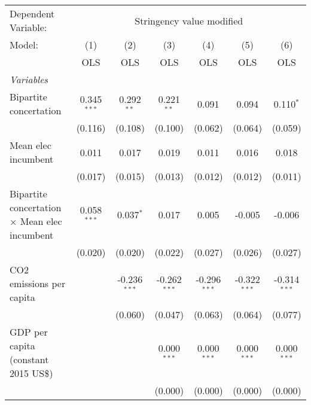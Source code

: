 
\begingroup
\centering
\begin{tabular}{lcccccc}
   \toprule
   Dependent Variable: & \multicolumn{6}{c}{Stringency value modified}\\
   Model:                                               & (1)           & (2)            & (3)            & (4)            & (5)            & (6)\\  
                                                        &  OLS          & OLS            & OLS            & OLS            & OLS            & OLS\\  
   \midrule
   \emph{Variables}\\
   Bipartite concertation                               & 0.345$^{***}$ & 0.292$^{**}$   & 0.221$^{**}$   & 0.091          & 0.094          & 0.110$^{*}$\\   
                                                        & (0.116)       & (0.108)        & (0.100)        & (0.062)        & (0.064)        & (0.059)\\   
   Mean elec incumbent                                  & 0.011         & 0.017          & 0.019          & 0.011          & 0.016          & 0.018\\   
                                                        & (0.017)       & (0.015)        & (0.013)        & (0.012)        & (0.012)        & (0.011)\\   
   Bipartite concertation $\times$ Mean elec incumbent  & 0.058$^{***}$ & 0.037$^{*}$    & 0.017          & 0.005          & -0.005         & -0.006\\   
                                                        & (0.020)       & (0.020)        & (0.022)        & (0.027)        & (0.026)        & (0.027)\\   
   CO2 emissions per capita                             &               & -0.236$^{***}$ & -0.262$^{***}$ & -0.296$^{***}$ & -0.322$^{***}$ & -0.314$^{***}$\\   
                                                        &               & (0.060)        & (0.047)        & (0.063)        & (0.064)        & (0.077)\\   
   GDP per capita (constant 2015 US\$)                  &               &                & 0.000$^{***}$  & 0.000$^{***}$  & 0.000$^{***}$  & 0.000$^{***}$\\   
                                                        &               &                & (0.000)        & (0.000)        & (0.000)        & (0.000)\\   

\end{tabular}
